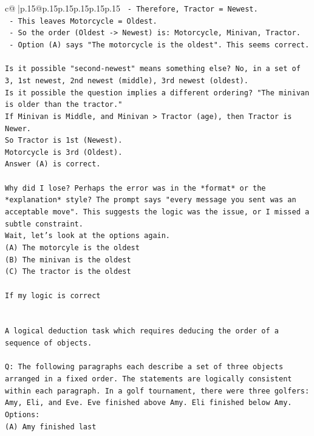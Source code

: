 \documentclass{article}
\begin{document}
{\begin{supertabular}{c@{$\;$}|p{.15\linewidth}@{}p{.15\linewidth}p{.15\linewidth}p{.15\linewidth}p{.15\linewidth}p{.15\linewidth}}
{{{\texttt{   {-} Therefore, Tractor = Newest.} \\
\texttt{   {-} This leaves Motorcycle = Oldest.} \\
\texttt{   {-} So the order (Oldest {-}> Newest) is: Motorcycle, Minivan, Tractor.} \\
\texttt{   {-} Option (A) says "The motorcycle is the oldest". This seems correct.} \\
\\ 
\texttt{Is it possible "second{-}newest" means something else? No, in a set of 3, 1st newest, 2nd newest (middle), 3rd newest (oldest).} \\
\texttt{Is it possible the question implies a different ordering? "The minivan is older than the tractor."} \\
\texttt{If Minivan is Middle, and Minivan > Tractor (age), then Tractor is Newer.} \\
\texttt{So Tractor is 1st (Newest).} \\
\texttt{Motorcycle is 3rd (Oldest).} \\
\texttt{Answer (A) is correct.} \\
\\ 
\texttt{Why did I lose? Perhaps the error was in the *format* or the *explanation* style? The prompt says "every message you sent was an acceptable move". This suggests the logic was the issue, or I missed a subtle constraint.} \\
\texttt{Wait, let's look at the options again.} \\
\texttt{(A) The motorcyle is the oldest} \\
\texttt{(B) The minivan is the oldest} \\
\texttt{(C) The tractor is the oldest} \\
\\ 
\texttt{If my logic is correct} \\
\\ 
\\ 
\texttt{A logical deduction task which requires deducing the order of a sequence of objects.} \\
\\ 
\texttt{Q: The following paragraphs each describe a set of three objects arranged in a fixed order. The statements are logically consistent within each paragraph. In a golf tournament, there were three golfers: Amy, Eli, and Eve. Eve finished above Amy. Eli finished below Amy.} \\
\texttt{Options:} \\
\texttt{(A) Amy finished last} \\
}}}
\end{supertabular}}
\end{document}
